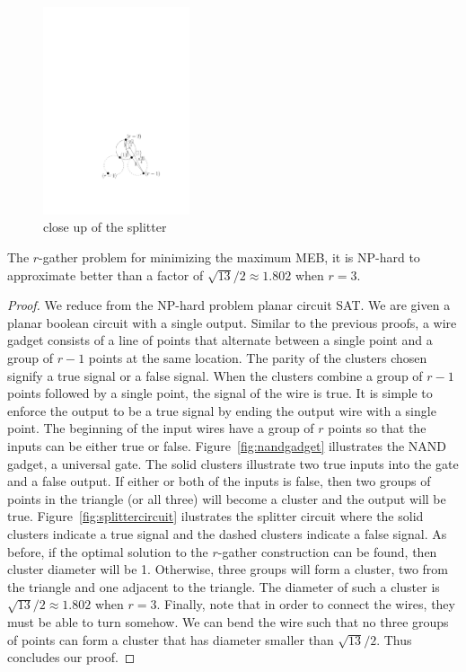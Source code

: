 \begin{figure}[htbp]
\begin{center}
\includegraphics[width=1.7in]{figs/splitter}
\caption{close up of the splitter}
\label{fig:splitter}
\end{center}
\end{figure}

\begin{theorem}
The $r$-gather problem for minimizing the maximum MEB, it is NP-hard to approximate better than a factor of $\sqrt{13}/2 \approx 1.802$ when $r=3$.
\end{theorem}
\begin{proof}
We reduce from the NP-hard problem planar circuit SAT.  We are given a planar boolean circuit with a single output.  Similar to the previous proofs, a wire gadget consists of a line of points that alternate between a single point and a group of $r-1$ points at the same location.  The parity of the clusters chosen signify a true signal or a false signal.  When the clusters combine a group of $r-1$ points followed by a single point, the signal of the wire is true.  It is simple to enforce the output to be a true signal by ending the output wire with a single point.  The beginning of the input wires have a group of $r$ points so that the inputs can be either true or false.  Figure~\ref{fig:nandgadget} illustrates the NAND gadget, a universal gate.  The solid clusters illustrate two true inputs into the gate and a false output.  If either or both of the inputs is false, then two groups of points in the triangle (or all three) will become a cluster and the output will be true.  Figure~\ref{fig:splittercircuit} ilustrates the splitter circuit where the solid clusters indicate a true signal and the dashed clusters indicate a false signal.  As before, if the optimal solution to the $r$-gather construction can be found, then cluster diameter will be 1.  Otherwise, three groups will form a cluster, two from the triangle and one adjacent to the triangle.  The diameter of such a cluster is $\sqrt{13}/2 \approx 1.802$ when $r=3$.  Finally, note that in order to connect the wires, they must be able to turn somehow.   We can bend the wire such that no three groups of points can form a cluster that has diameter smaller than $\sqrt{13}/2$.  Thus concludes our proof.
\end{proof}

